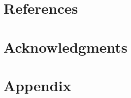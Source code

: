 \clearpage

\section{References}
\label{SEC:References}
\customprintbibliography


\clearpage
\section{Acknowledgments}
\label{SEC:Acknowledgments}



\clearpage


\section{Appendix}\label{SEC:Appendix}
\label{SEC:Appendix}





